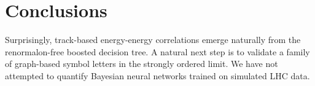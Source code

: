 \section{Conclusions}\label{sec:conclusions}

Surprisingly, track-based energy-energy correlations emerge naturally
from the renormalon-free boosted decision tree. A natural next step is
to validate a family of graph-based symbol letters in the strongly
ordered limit. We have not attempted to quantify Bayesian neural
networks trained on simulated LHC data.

